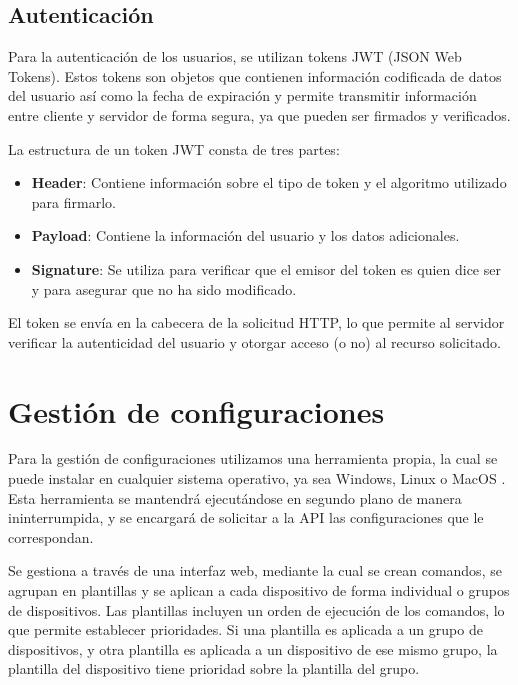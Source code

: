 \subsection{Autenticación}\label{subsec:autenticacion}

Para la autenticación de los usuarios, se utilizan tokens JWT (JSON Web Tokens)\cite{fusionauthJWT}.
Estos tokens son objetos que contienen información codificada de datos del usuario así como la fecha de expiración
y permite transmitir información entre cliente y servidor de forma segura, ya que pueden ser firmados y verificados.

La estructura de un token JWT consta de tres partes:

\begin{itemize}
	\item \textbf{Header}: Contiene información sobre el tipo de token y el algoritmo utilizado para firmarlo.
	\item \textbf{Payload}: Contiene la información del usuario y los datos adicionales.
	\item \textbf{Signature}: Se utiliza para verificar que el emisor del token es quien dice ser y para asegurar que
	no ha sido modificado.
\end{itemize}

El token se envía en la cabecera de la solicitud HTTP, lo que permite al servidor verificar la autenticidad del usuario
y otorgar acceso (o no) al recurso solicitado.

\section{Gestión de configuraciones}\label{sec:gestion-de-configuraciones}

Para la gestión de configuraciones utilizamos una herramienta propia, la cual se puede instalar en cualquier sistema
operativo, ya sea Windows, Linux o MacOS .
Esta herramienta se mantendrá ejecutándose en segundo plano de manera ininterrumpida, y se encargará de solicitar
a la API las configuraciones que le correspondan.

Se gestiona a través de una interfaz web, mediante la cual se crean comandos, se agrupan en plantillas y se aplican
a cada dispositivo de forma individual o grupos de dispositivos.
Las plantillas incluyen un orden de ejecución de los comandos, lo que permite establecer prioridades.
Si una plantilla es aplicada a un grupo de dispositivos, y otra plantilla es aplicada a un dispositivo de ese mismo
grupo, la plantilla del dispositivo tiene prioridad sobre la plantilla del grupo.

